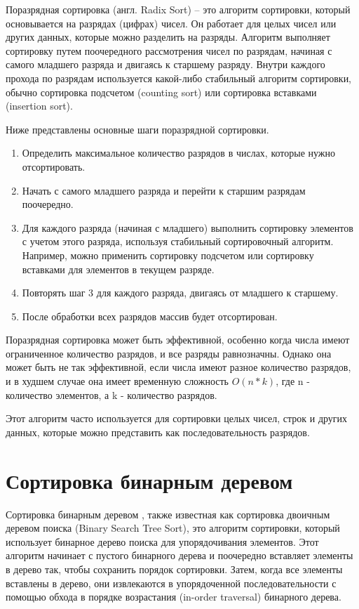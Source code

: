 Поразрядная сортировка (англ. Radix Sort) \cite{radix-sort} -- это алгоритм сортировки, который основывается на разрядах (цифрах) чисел. 
Он работает для целых чисел или других данных, которые можно разделить на разряды. 
Алгоритм выполняет сортировку путем поочередного рассмотрения чисел по разрядам, начиная с самого младшего разряда и двигаясь к старшему разряду. 
Внутри каждого прохода по разрядам используется какой-либо стабильный алгоритм сортировки, обычно сортировка подсчетом (counting sort) или сортировка вставками (insertion sort).

Ниже представлены основные шаги поразрядной сортировки.
\begin{enumerate}
\item Определить максимальное количество разрядов в числах, которые нужно отсортировать.
\item Начать с самого младшего разряда и перейти к старшим разрядам поочередно.
\item Для каждого разряда (начиная с младшего) выполнить сортировку элементов с учетом этого разряда, используя стабильный сортировочный алгоритм. Например, можно применить сортировку подсчетом или сортировку вставками для элементов в текущем разряде.
\item Повторять шаг 3 для каждого разряда, двигаясь от младшего к старшему.
\item После обработки всех разрядов массив будет отсортирован.
\end{enumerate}

Поразрядная сортировка может быть эффективной, особенно когда числа имеют ограниченное количество разрядов, и все разряды равнозначны. 
Однако она может быть не так эффективной, если числа имеют разное количество разрядов, и в худшем случае она имеет временную сложность $O(n*k)$, где n - количество элементов, а k - количество разрядов.

Этот алгоритм часто используется для сортировки целых чисел, строк и других данных, которые можно представить как последовательность разрядов.

\section{Сортировка бинарным деревом}
Сортировка бинарным деревом \cite{bst-sort}, также известная как сортировка двоичным деревом поиска (Binary Search Tree Sort), это алгоритм сортировки, который использует бинарное дерево поиска для упорядочивания элементов. 
Этот алгоритм начинает с пустого бинарного дерева \cite{bst-sort} и поочередно вставляет элементы в дерево так, чтобы сохранить порядок сортировки. 
Затем, когда все элементы вставлены в дерево, они извлекаются в упорядоченной последовательности с помощью обхода в порядке возрастания (in-order traversal) бинарного дерева.

